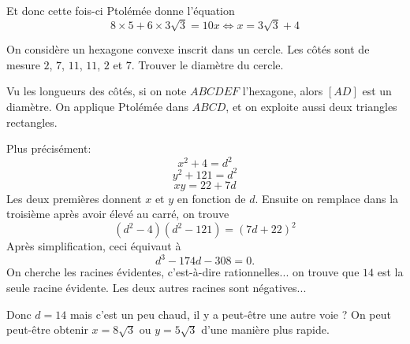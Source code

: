 \begin{exo}
\begin{sol}
\begin{enumerate}
\begin{center}
\end{center}
Et donc cette fois-ci Ptolémée donne l'équation
\[8\times 5+6\times 3\sqrt 3 = 10x \iff x=3\sqrt 3+4\]
\end{enumerate}
\end{sol}
\end{exo}


\begin{exo}
On considère un hexagone convexe inscrit dans un cercle. Les côtés sont de mesure $2$, $7$, $11$, $11$, $2$ et $7$. Trouver le diamètre du cercle.
\begin{sol}
Vu les longueurs des côtés, si on note $ABCDEF$ l'hexagone, alors $[AD]$ est un diamètre. On applique Ptolémée dans $ABCD$, et on exploite aussi deux triangles rectangles.

Plus précisément:
\[x^2+4=d^2\]
\[ y^2+121=d^2\]
\[ xy=22+7d\]
Les deux premières donnent $x$ et $y$ en fonction de $d$. Ensuite on remplace dans la troisième après avoir élevé au carré, on trouve
\[ (d^2-4)(d^2-121)=(7d+22)^2\]
Après simplification, ceci équivaut à 
\[ d^3-174d-308=0.\]
On cherche les racines évidentes, c'est-à-dire rationnelles... on trouve que $14$ est la seule racine évidente. Les deux autres racines sont négatives...


Donc $d=14$ mais c'est un peu chaud, il y a peut-être une autre voie  ?
On peut peut-être obtenir $x=8\sqrt 3$ ou $y=5\sqrt 3$ d'une manière plus rapide.
\end{sol}
\end{exo}
%
%





